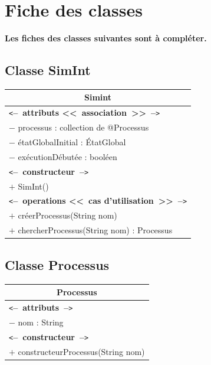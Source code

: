 \documentclass[11pt,article]{article}
\newcommand{\cmt}[1]{\texttt{<}\textbf{--~#1~--}\texttt{>}}
\begin{document}
\newpage

\section{Fiche des classes}

{\color{red}\textbf{Les fiches des classes suivantes sont à compléter.}}

\subsection{Classe \textsf{SimInt}}

\begin{center}
\begin{longtable}{|p{15cm}|} 
\hline
\multicolumn{1}{|c|}{{\Large \textsf{Simint}}} \\
\hline
\cmt{attributs <<~association~>>}\\
$-$ processus : collection de @Processus \\
$-$ étatGlobalInitial : ÉtatGlobal \\
$-$ exécutionDébutée : booléen \\
\hline
\cmt{constructeur} \\
$+$ SimInt()\\
\cmt{operations <<~cas d'utilisation~>>} \\
$+$ créerProcessus(String nom) \\
$+$ chercherProcessus(String nom) : Processus \\
\hline  
\end{longtable}%
\end{center}

\newpage

\subsection{Classe \textsf{Processus}}

\begin{center}
\begin{longtable}{|p{15cm}|} 
\hline
\multicolumn{1}{|c|}{{\Large \textsf{Processus}}} \\
\hline
\cmt{attributs}\\
$-$ nom : String \\
\hline
\cmt{constructeur} \\
$+$ constructeurProcessus(String nom)\\
\hline  
\end{longtable}%
\end{center}
\end{document}
